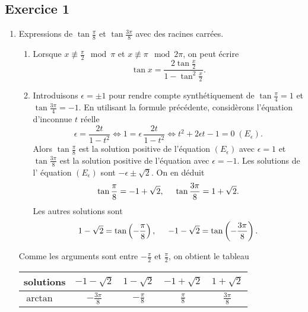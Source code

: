 \subsection*{Exercice 1}
\begin{enumerate}
  \item Expressions de $\tan \frac{\pi}{8}$ et $\tan \frac{3\pi}{8}$ avec des racines carrées.
\begin{enumerate}
  \item Lorsque $x \not \equiv \frac{\pi}{2} \mod \pi$ et $x \not \equiv \pi \mod 2\pi$, on peut écrire
\[
  \tan x = \frac{2 \tan \frac{x}{2}}{1 - \tan^2 \frac{x}{2}}.
\]
 \item Introduisons $\epsilon = \pm 1$ pour rendre compte synthétiquement de $\tan \frac{\pi}{4} = 1$ et $\tan \frac{3\pi}{4} = -1$. En utilisant la formule précédente, considèrons l'équation d'inconnue $t$ réelle
\[
  \epsilon = \frac{2t}{1-t^2} \Leftrightarrow 1 = \epsilon \, \frac{2t}{1-t^2} \Leftrightarrow t^2 + 2\epsilon t - 1 = 0\;(E_\epsilon).
\]
Alors $\tan \frac{\pi}{8}$ est la solution positive de l'équation $(E_\epsilon)$ avec $\epsilon = 1$ et $\tan \frac{3\pi}{8}$ est la solution positive de l'équation avec $\epsilon = -1$.\newline
Les solutions de l' équation $(E_\epsilon)$ sont $-\epsilon \pm \sqrt{2}$. On en déduit
\[
  \tan \frac{\pi}{8} = -1 + \sqrt{2}, \hspace{0.5cm} \tan \frac{3\pi}{8} = 1 + \sqrt{2}.
\]
Les autres solutions sont
\[
  1 - \sqrt{2} = \tan \left( -\frac{\pi}{8}\right),\hspace{0.5cm}
  -1 - \sqrt{2} = \tan \left( -\frac{3\pi}{8}\right).
\]
\end{enumerate}
Comme les arguments sont entre $-\frac{\pi}{2}$ et $\frac{\pi}{2}$, on obtient le tableau 
\begin{center}
\renewcommand{\arraystretch}{1.5}
\begin{tabular}{|l|c|c|c|c|} \hline
solutions & $-1-\sqrt{2}$     & $1-\sqrt{2}$     & $-1+\sqrt{2}$   & $1 + \sqrt{2}$    \\ \hline
$\arctan$ & $-\frac{3\pi}{8}$ & $-\frac{\pi}{8}$ & $\frac{\pi}{8}$ & $\frac{3\pi}{8}$ \\ \hline
\end{tabular}
\end{center}


\end{enumerate}
